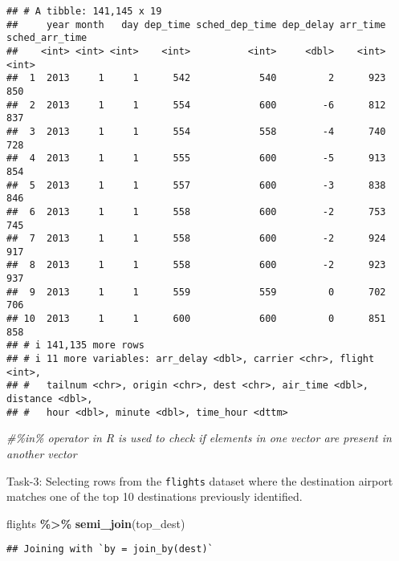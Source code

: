 \documentclass[
]{article}
\newenvironment{Shaded}{\begin{snugshade}}{\end{snugshade}}
\newcommand{\CommentTok}[1]{\textcolor[rgb]{0.56,0.35,0.01}{\textit{#1}}}
\newcommand{\FunctionTok}[1]{\textcolor[rgb]{0.13,0.29,0.53}{\textbf{#1}}}
\newcommand{\NormalTok}[1]{#1}
\newcommand{\SpecialCharTok}[1]{\textcolor[rgb]{0.81,0.36,0.00}{\textbf{#1}}}
\begin{document}
\begin{verbatim}
## # A tibble: 141,145 x 19
##     year month   day dep_time sched_dep_time dep_delay arr_time sched_arr_time
##    <int> <int> <int>    <int>          <int>     <dbl>    <int>          <int>
##  1  2013     1     1      542            540         2      923            850
##  2  2013     1     1      554            600        -6      812            837
##  3  2013     1     1      554            558        -4      740            728
##  4  2013     1     1      555            600        -5      913            854
##  5  2013     1     1      557            600        -3      838            846
##  6  2013     1     1      558            600        -2      753            745
##  7  2013     1     1      558            600        -2      924            917
##  8  2013     1     1      558            600        -2      923            937
##  9  2013     1     1      559            559         0      702            706
## 10  2013     1     1      600            600         0      851            858
## # i 141,135 more rows
## # i 11 more variables: arr_delay <dbl>, carrier <chr>, flight <int>,
## #   tailnum <chr>, origin <chr>, dest <chr>, air_time <dbl>, distance <dbl>,
## #   hour <dbl>, minute <dbl>, time_hour <dttm>
\end{verbatim}

\begin{Shaded}
\begin{Highlighting}[]
\CommentTok{\#\%in\% operator in R is used to check if elements in one vector are present in another vector}
\end{Highlighting}
\end{Shaded}

Task-3: Selecting rows from the \texttt{flights} dataset where the
destination airport matches one of the top 10 destinations previously
identified.

\begin{Shaded}
\begin{Highlighting}[]
\NormalTok{flights }\SpecialCharTok{\%\textgreater{}\%} 
  \FunctionTok{semi\_join}\NormalTok{(top\_dest)}
\end{Highlighting}
\end{Shaded}

\begin{verbatim}
## Joining with `by = join_by(dest)`
\end{verbatim}
\end{document}
